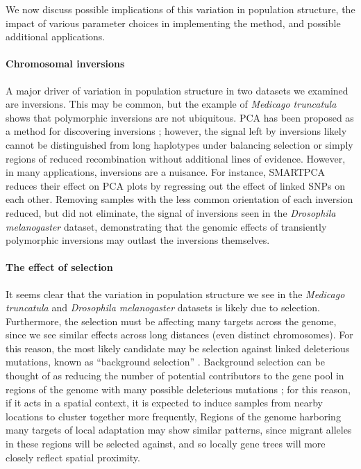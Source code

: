 \documentclass[11pt, oneside]{article}   	%
\begin{document}
We now discuss possible implications of this variation in population structure,
the impact of various parameter choices in implementing the method,
and possible additional applications.


\paragraph{Chromosomal inversions}
A major driver of variation in population structure in two datasets we examined are inversions.
This may be common,
but the example of \textit{Medicago truncatula} shows that polymorphic inversions are not ubiquitous.
PCA has been proposed as a method for discovering inversions \citep{ma2012investigation};
however, the signal left by inversions likely cannot be distinguished from long haplotypes under balancing selection 
or simply regions of reduced recombination
without additional lines of evidence.
However, in many applications, inversions are a nuisance.
For instance, SMARTPCA \citep{patterson2006population} reduces their effect on PCA plots
by regressing out the effect of linked SNPs on each other.
Removing samples with the less common orientation of each inversion reduced,
but did not eliminate, the signal of inversions
seen in the \textit{Drosophila melanogaster} dataset,
demonstrating that the genomic effects of transiently polymorphic inversions
may outlast the inversions themselves.


\paragraph{The effect of selection}
It seems clear that the variation in population structure we see in the \textit{Medicago truncatula} and \textit{Drosophila melanogaster} datasets
is likely due to selection.
Furthermore, 
the selection must be affecting many targets across the genome,
since we see similar effects across long distances (even distinct chromosomes).
For this reason, the most likely candidate may be selection against linked deleterious mutations, known as ``background selection'' \citep{charlesworth1993effect,charlesworth2013background}.
Background selection can be thought of as reducing the number of potential contributors to the gene pool in regions of the genome with many possible deleterious mutations \citep{hudson1995deleterious};
for this reason, if it acts in a spatial context, it is expected to induce samples from nearby locations to cluster together more frequently,
Regions of the genome harboring many targets of local adaptation may show similar patterns,
since migrant alleles in these regions will be selected against,
and so locally gene trees will more closely reflect spatial proximity.
\end{document}
